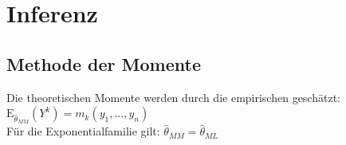 \documentclass[8pt]{extarticle}
\begin{document}




\section{Inferenz}


\subsection{Methode der Momente}

Die theoretischen Momente werden durch die empirischen geschätzt: \ \\
\vspace{0.5em}
$\mathrm{E}_{\hat{\theta}_{MM}}(Y^k) = m_k(y_1,...,y_n)$ \ \\
\vspace{0.5em}
\noindent Für die Exponentialfamilie gilt: $\hat{\theta}_{MM} = \hat{\theta}_{ML}$
\end{document}
